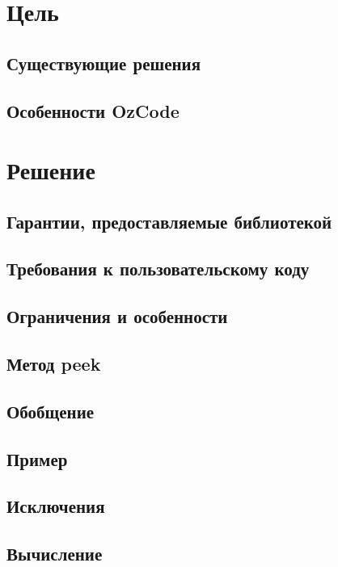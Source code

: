 \section{Цель}

\subsection{Существующие решения}

\subsection{Особенности OzCode}


\section{Решение}
\subsection{Гарантии, предоставляемые библиотекой}

\subsection{Требования к пользовательскому коду}

\subsection{Ограничения и особенности}

\subsection{Метод peek}


\subsection{Обобщение}

\subsection{Пример}

\subsection{Исключения}

\subsection{Вычисление}




